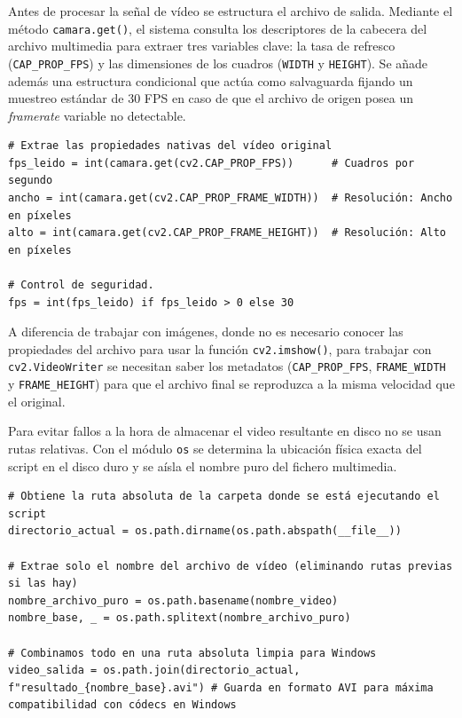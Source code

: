 Antes de procesar la señal de vídeo se estructura el archivo de salida. Mediante el método \texttt{camara.get()}, el sistema consulta los descriptores de la cabecera del archivo multimedia para extraer tres variables clave: la tasa de refresco (\texttt{CAP\_PROP\_FPS}) y las dimensiones de los cuadros (\texttt{WIDTH} y \texttt{HEIGHT}). Se añade además una estructura condicional que actúa como salvaguarda fijando un muestreo estándar de $30$ FPS en caso de que el archivo de origen posea un \textit{framerate} variable no detectable.

\begin{lstlisting}[style=pythonstyle, caption={Extracción de propiedades del video}, label={lst:propiedadesvid}]
# Extrae las propiedades nativas del vídeo original
fps_leido = int(camara.get(cv2.CAP_PROP_FPS))      # Cuadros por segundo
ancho = int(camara.get(cv2.CAP_PROP_FRAME_WIDTH))  # Resolución: Ancho en píxeles
alto = int(camara.get(cv2.CAP_PROP_FRAME_HEIGHT))  # Resolución: Alto en píxeles

# Control de seguridad.
fps = int(fps_leido) if fps_leido > 0 else 30
\end{lstlisting}

A diferencia de trabajar con imágenes, donde no es necesario conocer las propiedades del archivo para usar la función \texttt{cv2.imshow()}, para trabajar con \texttt{cv2.VideoWriter} se necesitan saber los metadatos (\texttt{CAP\_PROP\_FPS}, \texttt{FRAME\_WIDTH} y \texttt{FRAME\_HEIGHT}) para que el archivo final se reproduzca a la misma velocidad que el original.


Para evitar fallos a la hora de almacenar el video resultante en disco no se usan rutas relativas. Con el módulo \texttt{os} se determina la ubicación física exacta del script en el disco duro y se aísla el nombre puro del fichero multimedia.

\begin{lstlisting}[style=pythonstyle, caption={Ruta de guardado}, label={lst:ruta}]
# Obtiene la ruta absoluta de la carpeta donde se está ejecutando el script
directorio_actual = os.path.dirname(os.path.abspath(__file__))

# Extrae solo el nombre del archivo de vídeo (eliminando rutas previas si las hay)
nombre_archivo_puro = os.path.basename(nombre_video)
nombre_base, _ = os.path.splitext(nombre_archivo_puro)

# Combinamos todo en una ruta absoluta limpia para Windows
video_salida = os.path.join(directorio_actual, f"resultado_{nombre_base}.avi") # Guarda en formato AVI para máxima compatibilidad con códecs en Windows
\end{lstlisting}


